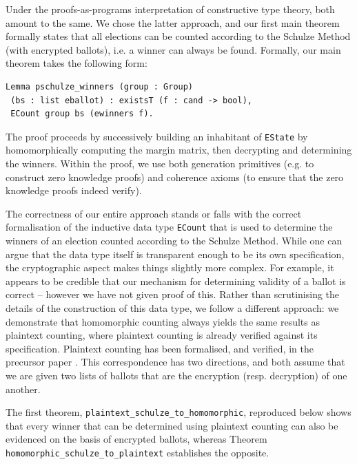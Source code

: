 \documentclass{llncs}
\begin{document}
Under the proofs-as-programs interpretation of constructive type
theory, both amount to the same. We chose the latter approach, and
our first main theorem formally states that all elections can be
counted according to the Schulze Method (with encrypted ballots),
i.e. a winner can always be found. Formally, our main theorem takes
the following form:
\begin{lstlisting}[frame=single,basicstyle=\ttfamily\footnotesize]
Lemma pschulze_winners (group : Group) 
 (bs : list eballot) : existsT (f : cand -> bool), 
 ECount group bs (ewinners f).
\end{lstlisting}

\noindent
The proof proceeds by successively building an inhabitant of
\texttt{EState} by homomorphically computing the margin matrix, then
decrypting and determining the winners. Within the proof, we use
both generation primitives (e.g. to construct zero knowledge proofs)
and coherence axioms (to ensure that the zero knowledge proofs
indeed verify). 

The correctness of our entire approach stands or falls with the
correct formalisation of the inductive data type \texttt{ECount}
that is used to determine the winners of an election counted
according to the Schulze Method. While one can argue that the data
type itself is transparent enough to be its own specification,
the cryptographic aspect makes things slightly more complex. For
example, it appears to be credible that our mechanism for
determining validity of a ballot is correct -- however we have not
given proof of this. Rather than scrutinising the details of the
construction of this data type, we follow a different approach: we
demonstrate that homomorphic counting always yields the same results
as plaintext counting, where plaintext counting is already verified
against its specification. Plaintext counting has been formalised,
and verified, in the precursor paper \cite{Pattinson:2017:SVE}. This
correspondence has two directions, and both assume that we are given
two lists of ballots that are the encryption (resp. decryption) of
one another. 

The first theorem, \texttt{plaintext\_schulze\_to\_homomorphic}, reproduced below shows
that every winner that can be determined using plaintext counting
can also be evidenced on the basis of encrypted ballots, whereas
Theorem \texttt{homomorphic\_schulze\_to\_plaintext} establishes the opposite.
\end{document}
